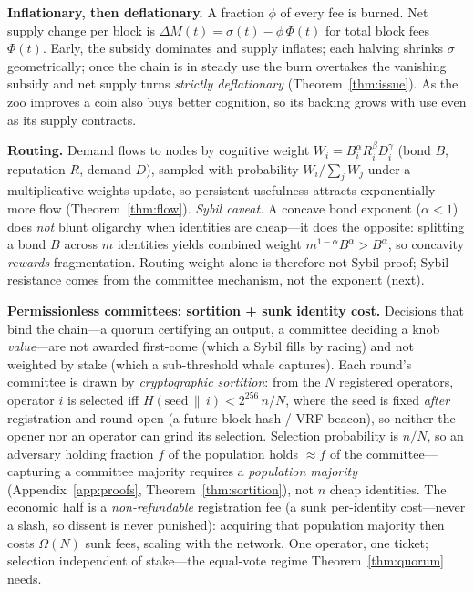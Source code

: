 \documentclass[11pt]{article}
\begin{document}
\medskip\noindent\textbf{Inflationary, then deflationary.} A fraction $\phi$ of every fee is burned. Net supply change per block is $\Delta M(t)=\sigma(t)-\phi\,\Phi(t)$ for total block fees $\Phi(t)$. Early, the subsidy dominates and supply inflates; each halving shrinks $\sigma$ geometrically; once the chain is in steady use the burn overtakes the vanishing subsidy and net supply turns \emph{strictly deflationary} (Theorem~\ref{thm:issue}). As the zoo improves a coin also buys better cognition, so its backing grows with use even as its supply contracts.

\medskip\noindent\textbf{Routing.} Demand flows to nodes by cognitive weight $W_i=B_i^{\alpha}R_i^{\beta}D_i^{\gamma}$ (bond $B$, reputation $R$, demand $D$), sampled with probability $W_i/\sum_j W_j$ under a multiplicative-weights update, so persistent usefulness attracts exponentially more flow (Theorem~\ref{thm:flow}). \emph{Sybil caveat.} A concave bond exponent ($\alpha<1$) does \emph{not} blunt oligarchy when identities are cheap---it does the opposite: splitting a bond $B$ across $m$ identities yields combined weight $m^{1-\alpha}B^{\alpha}>B^{\alpha}$, so concavity \emph{rewards} fragmentation. Routing weight alone is therefore not Sybil-proof; Sybil-resistance comes from the committee mechanism, not the exponent (next).

\medskip\noindent\textbf{Permissionless committees: sortition + sunk identity cost.} Decisions that bind the chain---a quorum certifying an output, a committee deciding a knob \emph{value}---are not awarded first-come (which a Sybil fills by racing) and not weighted by stake (which a sub-threshold whale captures). Each round's committee is drawn by \emph{cryptographic sortition}: from the $N$ registered operators, operator $i$ is selected iff $H(\mathrm{seed}\,\|\,i)<2^{256}\,n/N$, where the seed is fixed \emph{after} registration and round-open (a future block hash / VRF beacon), so neither the opener nor an operator can grind its selection. Selection probability is $n/N$, so an adversary holding fraction $f$ of the population holds $\approx f$ of the committee---capturing a committee majority requires a \emph{population majority} (Appendix~\ref{app:proofs}, Theorem~\ref{thm:sortition}), not $n$ cheap identities. The economic half is a \emph{non-refundable} registration fee (a sunk per-identity cost---never a slash, so dissent is never punished): acquiring that population majority then costs $\Omega(N)$ sunk fees, scaling with the network. One operator, one ticket; selection independent of stake---the equal-vote regime Theorem~\ref{thm:quorum} needs.
\end{document}
